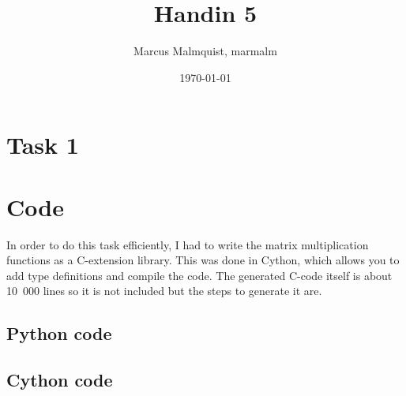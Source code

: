 \documentclass[12pt,a4paper]{article}
\title{Handin 5}
\author{Marcus Malmquist, marmalm}
\date{\today}
\begin{document}
\maketitle

\section{Task 1}\label{sec:1}


\newpage
\appendix
\section{Code}
In order to do this task efficiently, I had to write the matrix multiplication functions as a C-extension library. This was done in Cython, which allows you to add type definitions and compile the code. The generated C-code itself is about 10~000 lines so it is not included but the steps to generate it are.
\subsection{Python code}
\begin{changemargin}{-3cm}{0.5cm}

\end{changemargin}
\newpage
\begin{changemargin}{-3cm}{0.5cm}

\end{changemargin}
\newpage
\subsection{Cython code}
\begin{changemargin}{-3cm}{0.5cm}

\end{changemargin}
\end{document}
